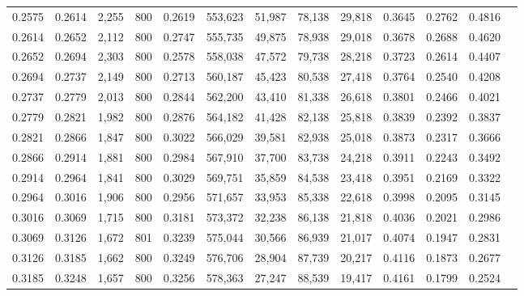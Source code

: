 \begin{tabular}{rrrrrrrrrrrrr}
0.2575 & 0.2614 &  2,255 & 800 &                                     0.2619 & 553,623 &  51,987 &  78,138 &  29,818 & 0.3645 & 0.2762 & 0.4816 \\
0.2614 & 0.2652 &  2,112 & 800 &                                     0.2747 & 555,735 &  49,875 &  78,938 &  29,018 & 0.3678 & 0.2688 & 0.4620 \\
0.2652 & 0.2694 &  2,303 & 800 &                                     0.2578 & 558,038 &  47,572 &  79,738 &  28,218 & 0.3723 & 0.2614 & 0.4407 \\
0.2694 & 0.2737 &  2,149 & 800 &                                     0.2713 & 560,187 &  45,423 &  80,538 &  27,418 & 0.3764 & 0.2540 & 0.4208 \\
0.2737 & 0.2779 &  2,013 & 800 &                                     0.2844 & 562,200 &  43,410 &  81,338 &  26,618 & 0.3801 & 0.2466 & 0.4021 \\
0.2779 & 0.2821 &  1,982 & 800 &                                     0.2876 & 564,182 &  41,428 &  82,138 &  25,818 & 0.3839 & 0.2392 & 0.3837 \\
0.2821 & 0.2866 &  1,847 & 800 &                                     0.3022 & 566,029 &  39,581 &  82,938 &  25,018 & 0.3873 & 0.2317 & 0.3666 \\
0.2866 & 0.2914 &  1,881 & 800 &                                     0.2984 & 567,910 &  37,700 &  83,738 &  24,218 & 0.3911 & 0.2243 & 0.3492 \\
0.2914 & 0.2964 &  1,841 & 800 &                                     0.3029 & 569,751 &  35,859 &  84,538 &  23,418 & 0.3951 & 0.2169 & 0.3322 \\
0.2964 & 0.3016 &  1,906 & 800 &                                     0.2956 & 571,657 &  33,953 &  85,338 &  22,618 & 0.3998 & 0.2095 & 0.3145 \\
0.3016 & 0.3069 &  1,715 & 800 &                                     0.3181 & 573,372 &  32,238 &  86,138 &  21,818 & 0.4036 & 0.2021 & 0.2986 \\
0.3069 & 0.3126 &  1,672 & 801 &                                     0.3239 & 575,044 &  30,566 &  86,939 &  21,017 & 0.4074 & 0.1947 & 0.2831 \\
0.3126 & 0.3185 &  1,662 & 800 &                                     0.3249 & 576,706 &  28,904 &  87,739 &  20,217 & 0.4116 & 0.1873 & 0.2677 \\
0.3185 & 0.3248 &  1,657 & 800 &                                     0.3256 & 578,363 &  27,247 &  88,539 &  19,417 & 0.4161 & 0.1799 & 0.2524 \\

\end{tabular}
